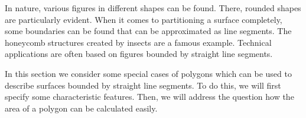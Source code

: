 


\begin{MIntro}

In nature, various figures in different shapes can be found. There, 
rounded shapes are particularly evident. When it comes to partitioning a surface 
completely, some boundaries can be found that can be approximated as line 
segments. The honeycomb structures created by 
insects are a famous example. Technical applications are often based on figures bounded by straight 
line segments.
 

In this section we consider some special cases of polygons which can be 
used to describe surfaces bounded by straight line segments. To do this, we
will first specify some characteristic features. Then, we will address the 
question how the area of a polygon can be calculated easily.
\end{MIntro}


